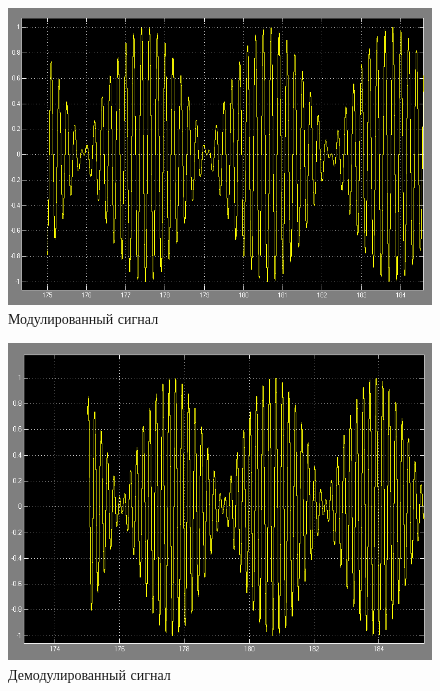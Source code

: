\documentclass[a4paper, 12pt]{article}
\begin{document}

\begin{figure}[H]
   \includegraphics[scale=0.5]{lab7/Scope.png}
   \caption{Модулированный сигнал}
\end{figure}
\begin{figure}[H]
   \includegraphics[scale=0.5]{lab7/Scope3.png}
   \caption{Демодулированный сигнал}
\end{figure}
\end{document}
